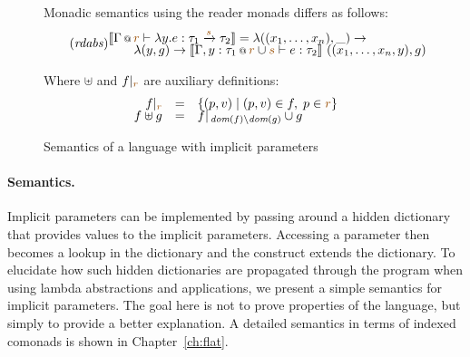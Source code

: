 \begin{figure}
\vspace{1em}
{\small Monadic semantics using the reader monads differs as follows:}
\begin{equation}
\tag{\emph{rdabs}}
\hspace{-0.5em}
\begin{array}{l}
  \sem{\coctx{\Gamma}{\aclrd{r}} \vdash \lambda y. e : \tau_1 \xrightarrow{\aclrd{s}} \tau_2 } = \lambda ((x_1, \ldots, x_n), \_) \rightarrow\\[-0.25em]
  \qquad\lambda (y, g) \rightarrow \sem{ \coctx{\Gamma,y:\tau_1}{\aclrd{r}\cup\aclrd{s}} \vdash e : \tau_2 }~((x_1, \ldots, x_n, y), g)   	 
\end{array}
\end{equation}

\vspace{1em}
{\small Where $\uplus$ and $\restr{f}{\aclrd{r}}$ are auxiliary definitions:}
\begin{equation*}
\begin{array}{rcl}
 \restr{f}{\aclrd{r}} &=& \{ (p,v) \;|\; (p,v) \in f, \;p \in \aclrd{r} \}\\[-0.25em]
 f \uplus g &=& \restr{f}{\, \textit{dom}(f) \setminus \textit{dom}(g)} \cup g 
\end{array}
\end{equation*}


\caption{Semantics of a language with implicit parameters}
\label{fig:applications-flat-implsem}
\end{figure}


\paragraph{Semantics.}
Implicit parameters can be implemented by passing around a hidden dictionary that provides values
to the implicit parameters. Accessing a parameter then becomes a lookup in the dictionary and
the  construct extends the dictionary. To elucidate how such hidden dictionaries 
are propagated through the program when using lambda abstractions and applications, we present a 
simple semantics for implicit parameters. The goal here is not to prove properties of the language,
but simply to provide a better explanation. A detailed semantics in terms of indexed comonads is
shown in Chapter~\ref{ch:flat}.

